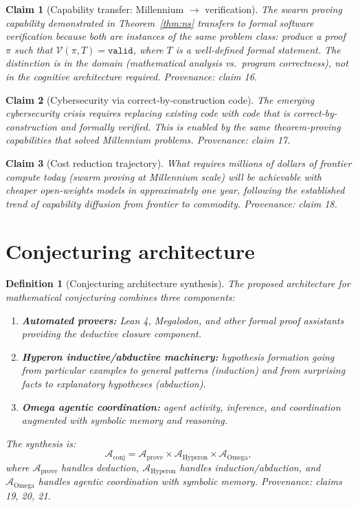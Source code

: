 \documentclass[11pt]{article}
\newtheorem{definition}{Definition}
\newtheorem{claim}{Claim}
\newcommand{\cA}{\mathcal{A}}
\newcommand{\cV}{\mathcal{V}}
\begin{document}
\begin{claim}[Capability transfer: Millennium $\to$ verification]\label{cl:transfer}
The swarm proving capability demonstrated in Theorem~\ref{thm:ns} transfers
to formal software verification because both are instances of the same
problem class: produce a proof $\pi$ such that $\cV(\pi, T) = \texttt{valid}$,
where $T$ is a well-defined formal statement.  The distinction is in the
domain (mathematical analysis vs.\ program correctness), not in the
cognitive architecture required.
\emph{Provenance: claim 16.}
\end{claim}

\begin{claim}[Cybersecurity via correct-by-construction code]\label{cl:cyber}
The emerging cybersecurity crisis requires replacing existing code with code
that is correct-by-construction and formally verified.  This is enabled by
the same theorem-proving capabilities that solved Millennium problems.
\emph{Provenance: claim 17.}
\end{claim}

\begin{claim}[Cost reduction trajectory]\label{cl:cost}
What requires millions of dollars of frontier compute today (swarm
proving at Millennium scale) will be achievable with cheaper open-weights
models in approximately one year, following the established trend of
capability diffusion from frontier to commodity.
\emph{Provenance: claim 18.}
\end{claim}


\section{Conjecturing architecture}

\begin{definition}[Conjecturing architecture synthesis]\label{def:conjarch}
The proposed architecture for mathematical conjecturing combines three
components:
\begin{enumerate}
  \item \textbf{Automated provers:} Lean 4, Megalodon, and other formal
    proof assistants providing the deductive closure component.
  \item \textbf{Hyperon inductive/abductive machinery:} hypothesis
    formation going from particular examples to general patterns (induction)
    and from surprising facts to explanatory hypotheses (abduction).
  \item \textbf{Omega agentic coordination:} agent activity, inference,
    and coordination augmented with symbolic memory and reasoning.
\end{enumerate}
The synthesis is:
\[
  \cA_{\mathrm{conj}} = \cA_{\mathrm{prove}} \times
  \cA_{\mathrm{Hyperon}} \times \cA_{\mathrm{Omega}},
\]
where $\cA_{\mathrm{prove}}$ handles deduction, $\cA_{\mathrm{Hyperon}}$
handles induction/abduction, and $\cA_{\mathrm{Omega}}$ handles agentic
coordination with symbolic memory.
\emph{Provenance: claims 19, 20, 21.}
\end{definition}
\end{document}
